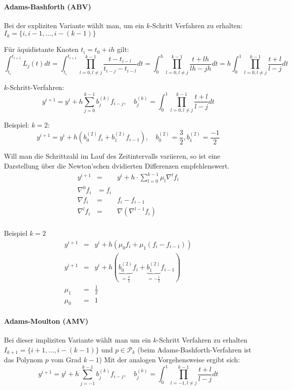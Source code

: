 \paragraph{Adams-Bashforth (ABV)}
Bei der expliziten Variante wählt man, um ein $k$-Schritt Verfahren zu erhalten: $I_{k}=\{i,i-1,\ldots,i-(k-1)\}$

Für äquidistante Knoten $t_{i}=t_{0}+ih$ gilt:
$$\int_{t_{i}}^{t_{i+1}}L_{j}(t)dt = \int_{t_{i}}^{t_{i+1}}\prod_{l=0,l\not = j}^{k-1}\frac{t-t_{i-l}}{t_{i-j}-t_{i-l}}dt
= \int_{0}^{h}\prod_{l=0,l\not = j}^{k-1}\frac{t+lh}{lh-jh}dt=h\int_{0}^{1}\prod_{l=0,l\not=j}^{k-1}\frac{t+l}{l-j}dt$$

$k$-Schritt-Verfahren:
$$y^{i+1}=y^{i}+h\sum_{j=0}^{k-1}b_{j}^{(k)}f_{i-j},\quad b_{j}^{(k)}=\int_{0}^{1}\prod_{l=0,l\not = j}^{k-1}\frac{t+l}{l-j}dt$$

\begin{example}
Beispiel: $k=2$:
$$y^{i+1}=y^{i}+h(b_{0}^{(2)}f_{i}+b_{1}^{(2)}f_{i-1}),\quad b_{0}^{(2)}=\frac{3}{2},b_{1}^{(2)}=\frac{-1}{2}$$
\end{example}

\begin{remark}
	Will man die Schrittzahl im Lauf des Zeitintervalls variieren, so ist eine Darstellung über die Newton'schen dvidierten Differenzen
	empfehlenswert.
	\begin{eqnarray*}
	y^{i+1}&=&y^{i}+h\cdot \sum_{l=0}^{k-1}\mu_{l}\nabla^{l}f_{i}\\
	\nabla^{0}f_{i}&=f_{i}\\
	\nabla f_{i}&=&f_{i}-f_{i-1}\\
	\nabla^{l} f_{i}&=&\nabla(\nabla^{l-1}f_{i})\\
	\end{eqnarray*}
\end{remark}

\begin{example}
 Beispiel $k=2$
 \begin{eqnarray*}
 	y^{i+1}&=&y^{i}+h(\mu_{0}f_{i}+\mu_{1}(f_{i}-f_{i-1}))\\
 	y^{i+1}&=&y^{i}+h(\underbrace{b_{0}^{(2)}}_{=\frac{3}{2}}f_{i}+\underbrace{b_{1}^{(2)}}_{=-\frac{1}{2}}f_{i-1})\\
 	\mu_{1}&=&\frac{1}{2}\\
 	\mu_{0}&=&1
 \end{eqnarray*}
\end{example}

\paragraph{Adams-Moulton (AMV)}
Bei dieser impliziten Variante wählt man um ein $k$-Schritt Verfahren zu erhalten $I_{k+1}=\{i+1,\ldots,i-(k-1)\}$ und $p\in \mathcal{P}_{k}$
(beim Adams-Bashforth-Verfahren ist das Polynom $p$ vom Grad $k-1$) Mit der analogen Vorgehensweise ergibt sich:
$$y^{i+1}=y^{i}+h\sum_{j=-1}^{k-1}b_{j}^{(k)}f_{i-j},\quad b_{j}^{(k)}=\int_{0}^{1}\prod_{l=-1,l\not =j}^{k-1}\frac{t+l}{l-j}dt$$

